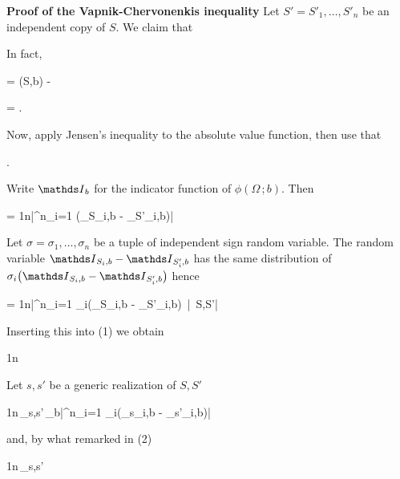 \documentclass[scombinatorics.tex]{subfiles}
\begin{document}
\textbf{Proof of the Vapnik-Chervonenkis inequality}
Let $S'=S'_1,\dots,S'_n$ be an independent copy of $S$.
We claim that

{\le}
{\Ex{}}

In fact,

{=}
{\Fr(S,b) - \Ex\big[\Fr(S',b)\big]}

\ceq{}
{=}
{\Ex{}.}

Now, apply Jensen's inequality to the absolute value function, then use that 

{\le}
{\Ex{}.}

Write $\Indicator_b$ for the indicator function of $\phi(\Omega\,;b)$.
Then

{=}
{\frac1n\bigg|\sum^n_{i=1} \Big(\Indicator_{S_i,b} -  \Indicator_{S'_i,b}\Big)\bigg|}

Let $\sigma=\sigma_1,\dots,\sigma_n$ be a tuple of independent sign random variable.
The random variable $\Indicator_{S_i,b} -  \Indicator_{S'_i,b}$ has the same distribution of $\sigma_i\big(\Indicator_{S_i,b} -  \Indicator_{S'_i,b}\big)$ hence

\ceq{}
{=}
{\frac1n\Ex\bigg|\sum^n_{i=1} \sigma_i\Big(\Indicator_{S_i,b} -  \Indicator_{S'_i,b}\Big)\ \Big|\ S,S'\bigg|}

Inserting this into (1) we obtain


{\le}
{\frac1n\,\Ex\bigg[\sup_{b\in\V}\Ex\bigg|\sum^n_{i=1} \sigma_i\Big(\Indicator_{S_i,b} -  \Indicator_{S'_i,b}\Big)\ \Big|\ S,S'\bigg|\bigg]}

Let $s,s'$ be a generic realization of $S,S'$


\ceq{}
{\le}
{\frac1n\,\sup_{s,s'}\,\sup_{b\in\V}\Ex\bigg|\sum^n_{i=1} \sigma_i\big(\Indicator_{s_i,b} -  \Indicator_{s'_i,b}\big)\bigg|}

and, by what remarked in (2)

\ceq{}
{\le}
{\frac1n\,\sup_{s,s'}\Ex\bigg[\sup_{b\in\V}\bigg|\sum^n_{i=1} \sigma_i\big(\Indicator_{s_i,b} -  \Indicator_{s'_i,b}\big)\bigg|\bigg]}
\end{document}
